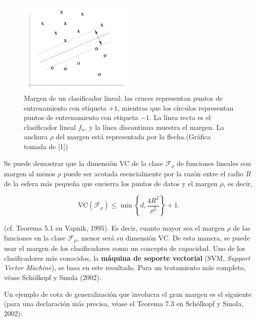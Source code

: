\documentclass{report}
\begin{document}
\begin{figure}[ht!]
    \centering
    \includegraphics[width=0.5\textwidth]{Images/6.png}
    \caption{Margen de un clasificador lineal: las cruces representan puntos de entrenamiento con 
    etiqueta \(+1\), mientras que los círculos representan puntos de entrenamiento con etiqueta \(-1\). 
    La línea recta es el clasificador lineal \(f_n\), y la línea discontinua muestra el margen. La 
    anchura \(\rho\) del margen está representada por la flecha.(Gráfica tomada de [1])}
    \label{fig:Clasificación con margen}
\end{figure}

Se puede demostrar que la dimensión VC de la clase \(\mathcal{F}_\rho\) de funciones lineales con 
margen al menos \(\rho\) puede ser acotada esencialmente por la razón entre el radio \(R\) de la 
esfera más pequeña que encierra los puntos de datos y el margen \(\rho\), es decir,

\[
\text{VC}(\mathcal{F}_\rho) \leq \min \left\{d, \frac{4R^2}{\rho^2} \right\} +1.
\]

(cf. Teorema 5.1 en Vapnik, 1995). Es decir, cuanto mayor sea el margen \(\rho\) de las funciones 
en la clase \(\mathcal{F}_\rho\), menor será su dimensión VC. De esta manera, se puede usar el 
margen de los clasificadores como un concepto de capacidad. Uno de los clasificadores más conocidos, 
la \textbf{máquina de soporte vectorial} (SVM, \textit{Support Vector Machine}), se basa en este 
resultado. Para un tratamiento más completo, véase Schölkopf y Smola (2002).\newline

Un ejemplo de cota de generalización que involucra el gran margen es el siguiente (para una 
declaración más precisa, véase el Teorema 7.3 en Schölkopf y Smola, 2002):\newline
\end{document}
